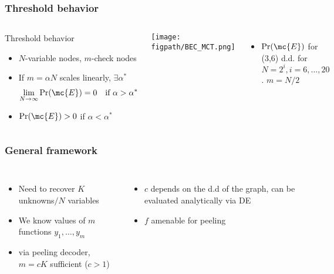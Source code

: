 \begin{frame}\frametitle{Threshold behavior}
\begin{columns}
\begin{defn}{Threshold behavior}
\begin{itemize}
\item $N$-variable nodes, $m$-check nodes %
\item If $m=\alpha N$ scales linearly, $\exists \alpha^{*}$
\begin{align*}
\lim_{N\rightarrow \infty}\Pr(\mc{E})=0 ~~ \text{ if }\alpha>\alpha^*
\end{align*}
\item $\Pr(\mc{E})>0$ if $\alpha<\alpha^*$
\end{itemize}
\end{defn}

\pause

\texttt{[image: \\figpath/BEC\_MCT.png]}
\begin{itemize}
\item $\Pr(\mc{E})$ for (3,6) d.d. for $N=2^i, i=6,\ldots,20$.  $m=N/2$
\end{itemize}

\end{columns}
\end{frame}

\begin{frame}\frametitle{General framework}
\begin{columns}
\resizebox{\textwidth}{!}{}

\begin{itemize}
\item Need to recover $K$ unknowns$/N$ variables
\item We know values of $m$ functions $y_1,\ldots,y_m$
\item via peeling decoder, $m=cK$ sufficient {\tiny ($c>1$)}
\end{itemize}
\pause
\vspace{5ex}
\begin{itemize}
\item $c$ depends on the d.d of the graph, can be evaluated analytically via DE
\item $f$ amenable for peeling
\end{itemize}

\end{columns}
\end{frame}


